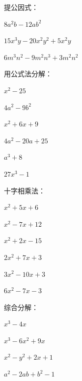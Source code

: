\documentclass[a4paper,12pt]{ctexart}
\begin{document}
\begin{exercise}
\item 提公因式：
  \begin{subexercise}
    \item $8a^2b-12ab^2$
    \item $15x^3y-20x^2y^2+5x^2y$
    \item $6m^3n^2-9m^2n^3+3m^2n^2$
  \end{subexercise}

\item 用公式法分解：
  \begin{subexercise}
    \item $x^2-25$
    \item $4a^2-9b^2$
    \item $x^2+6x+9$
    \item $4a^2-20a+25$
    \item $a^3+8$
    \item $27x^3-1$
  \end{subexercise}

\item 十字相乘法：
  \begin{subexercise}
    \item $x^2+5x+6$
    \item $x^2-7x+12$
    \item $x^2+2x-15$
    \item $2x^2+7x+3$
    \item $3x^2-10x+3$
    \item $6x^2-7x-3$
  \end{subexercise}

\item 综合分解：
  \begin{subexercise}
    \item $x^3-4x$
    \item $x^3-6x^2+9x$
    \item $x^2-y^2+2x+1$
    \item $a^2-2ab+b^2-1$
  \end{subexercise}
\end{exercise}

\newpage



\end{document}

